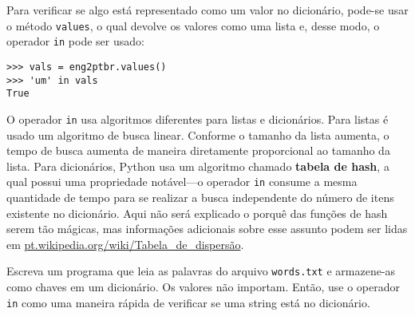 Para verificar se algo está representado como um valor no dicionário, pode-se usar o método {\tt values}, o qual devolve os valores como uma lista e, desse
modo, o operador {\tt in} pode ser usado:


\beforeverb
\begin{verbatim}
>>> vals = eng2ptbr.values()
>>> 'um' in vals
True
\end{verbatim}
\afterverb
%

O operador {\tt in} usa algoritmos diferentes para listas e dicionários. Para
listas é usado um algoritmo de busca linear. Conforme o tamanho da lista aumenta, o tempo de busca aumenta de maneira diretamente proporcional ao tamanho da lista.
Para dicionários, Python usa um algoritmo chamado {\bf tabela de hash}, a qual possui uma propriedade notável---o operador {\tt in} consume a mesma quantidade de tempo para se realizar a busca independente do número de itens existente no dicionário. Aqui não será explicado o porquê das funções de hash serem tão mágicas, mas informações adicionais sobre esse assunto podem ser lidas em \url{pt.wikipedia.org/wiki/Tabela_de_dispersão}.


\begin{ex}
\label{wordlist2}


Escreva um programa que leia as palavras do arquivo {\tt words.txt} e armazene-as como chaves em um dicionário. Os valores não importam. Então, use o operador {\tt in} como uma maneira rápida de verificar se uma string está no dicionário.

\end{ex}

